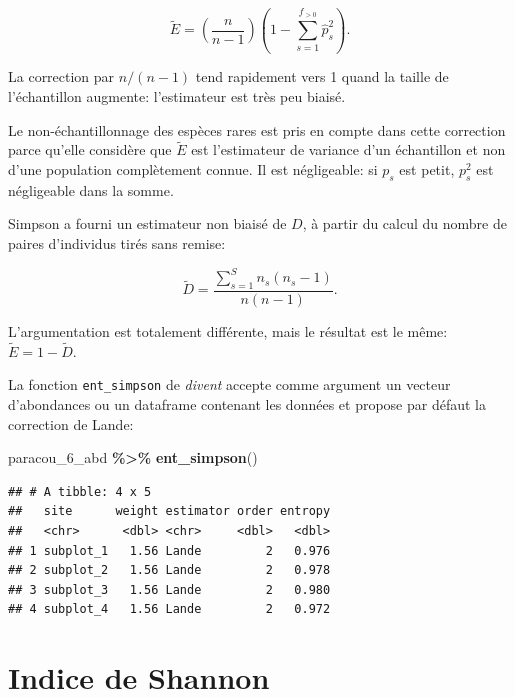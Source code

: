 \documentclass[
  11pt,
  american,
  a4paper,
  extrafontsizes,onecolumn,openright
  ]{memoir}
\newenvironment{Shaded}{\begin{snugshade}}{\end{snugshade}}
\newcommand{\FunctionTok}[1]{\textcolor[rgb]{0.13,0.29,0.53}{\textbf{#1}}}
\newcommand{\NormalTok}[1]{#1}
\newcommand{\SpecialCharTok}[1]{\textcolor[rgb]{0.81,0.36,0.00}{\textbf{#1}}}
\begin{document}
\begin{equation} 
  \label{eq:BiaisSimpson}
  \tilde{E} 
  = \left( \frac{n}{n-1} \right) \left( 1 - \sum^{f_{>0}}_{s=1}{{\hat{p}}^2_s} \right).
\end{equation}

La correction par \(n / (n - 1)\) tend rapidement vers 1 quand la taille de l'échantillon augmente: l'estimateur est très peu biaisé.

Le non-échantillonnage des espèces rares est pris en compte dans cette correction parce qu'elle considère que \(\tilde{E}\) est l'estimateur de variance d'un échantillon et non d'une population complètement connue.
Il est négligeable: si \(p_s\) est petit, \(p^2_s\) est négligeable dans la somme.

Simpson a fourni un estimateur non biaisé de \(D\), à partir du calcul du nombre de paires d'individus tirés sans remise:

\begin{equation}
  \label{eq:EstSimpson1949}
  \tilde{D} 
  = \frac{\sum^{S}_{s=1}{n_s \left( n_s - 1 \right)}}{n \left( n - 1 \right)}.
\end{equation}

L'argumentation est totalement différente, mais le résultat est le même: \(\tilde{E}=1-\tilde{D}\).

La fonction \texttt{ent\_simpson} de \emph{divent} accepte comme argument un vecteur d'abondances ou un dataframe contenant les données et propose par défaut la correction de Lande:

\scriptsize

\begin{Shaded}
\begin{Highlighting}[]
\NormalTok{paracou\_6\_abd }\SpecialCharTok{\%\textgreater{}\%} 
  \FunctionTok{ent\_simpson}\NormalTok{()}
\end{Highlighting}
\end{Shaded}

\begin{verbatim}
## # A tibble: 4 x 5
##   site      weight estimator order entropy
##   <chr>      <dbl> <chr>     <dbl>   <dbl>
## 1 subplot_1   1.56 Lande         2   0.976
## 2 subplot_2   1.56 Lande         2   0.978
## 3 subplot_3   1.56 Lande         2   0.980
## 4 subplot_4   1.56 Lande         2   0.972
\end{verbatim}

\normalsize

\section{Indice de Shannon}\label{indice-de-shannon}
\end{document}

